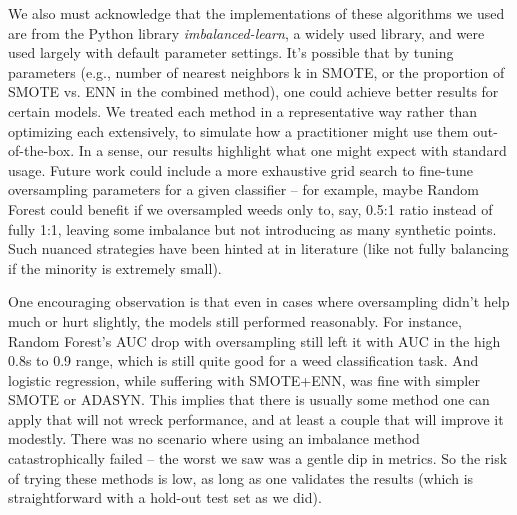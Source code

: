 \documentclass[agriengineering,article,submit,pdftex,moreauthors]{Definitions/mdpi}
\begin{document}
We also must acknowledge that the implementations of these algorithms we used are from the Python library \textit{imbalanced-learn}, a widely used library, and were used largely with default parameter settings. It’s possible that by tuning parameters (e.g., number of nearest neighbors k in SMOTE, or the proportion of SMOTE vs. ENN in the combined method), one could achieve better results for certain models. We treated each method in a representative way rather than optimizing each extensively, to simulate how a practitioner might use them out-of-the-box. In a sense, our results highlight what one might expect with standard usage. Future work could include a more exhaustive grid search to fine-tune oversampling parameters for a given classifier – for example, maybe Random Forest could benefit if we oversampled weeds only to, say, 0.5:1 ratio instead of fully 1:1, leaving some imbalance but not introducing as many synthetic points. Such nuanced strategies have been hinted at in literature (like not fully balancing if the minority is extremely small).

One encouraging observation is that even in cases where oversampling didn’t help much or hurt slightly, the models still performed reasonably. For instance, Random Forest’s AUC drop with oversampling still left it with AUC in the high 0.8s to 0.9 range, which is still quite good for a weed classification task. And logistic regression, while suffering with SMOTE+ENN, was fine with simpler SMOTE or ADASYN. This implies that there is usually some method one can apply that will not wreck performance, and at least a couple that will improve it modestly. There was no scenario where using an imbalance method catastrophically failed – the worst we saw was a gentle dip in metrics. So the risk of trying these methods is low, as long as one validates the results (which is straightforward with a hold-out test set as we did).
\end{document}
